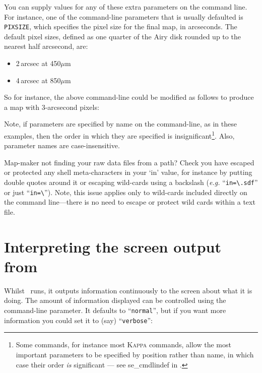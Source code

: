 You can supply values for any of these extra parameters on the command
line. For instance, one of the command-line parameters that is usually
defaulted is \texttt{PIXSIZE}, which specifies the pixel size for the final
map, in arcseconds. The default pixel sizes, defined as one quarter of the
Airy disk rounded up to the nearest half arcsecond, are:

\begin{itemize}
\item 2\,arcsec at 450$\mu$m
\item 4\,arcsec at 850$\mu$m
\end{itemize}

So for instance, the above command-line could be modified as follows to
produce a map with 3-arcsecond pixels:


Note, if parameters are specified by name on the command-line, as
in these examples, then the order in which they are specified is
insignificant\footnote{Some commands, for instance most \textsc{Kappa}
commands, allow the most important parameters to be specified by position
rather than name, in which case their order \emph{is} significant ---
see 
{se_cmdlindef} in .}. Also, parameter names are
case-insensitive.

\begin{tip}
  Map-maker not finding your raw data files from a path? Check you have
  escaped or protected any shell meta-characters in your `in' value,
  for instance by putting double quotes around it or escaping
  wild-cards using a backslash (\emph{e.g.} ``\texttt{in=\textbackslash*.sdf}''
  or just ``\texttt{in=\textbackslash*}''). Note, this issue applies only to
  wild-cards included directly on the command line---there is no need to
  escape or protect wild cards within a text file.
\end{tip}

\section{Interpreting the screen output from }

Whilst \makemap\ runs, it outputs information continuously to the screen
about what it is doing. The amount of information displayed can be
controlled using the  command-line
parameter. It defaults to ``\texttt{normal}'', but if you want more
information you could set it to (say) ``\texttt{verbose}'':

